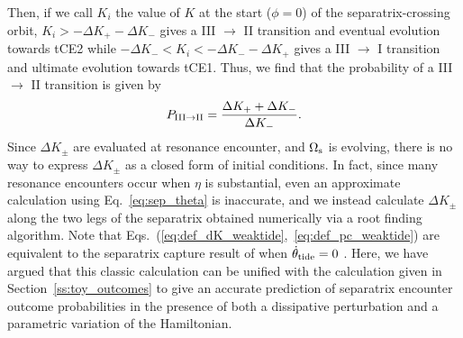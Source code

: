 \documentclass[
        fleqn,
        usenatbib,
    ]{mnras}
\begin{document}
Then, if we call $K_i$ the value of $K$ at the start ($\phi = 0$) of the
separatrix-crossing orbit, $K_i > -\Delta K_+ - \Delta K_-$ gives a III
$\to$ II transition and eventual evolution towards tCE2 while $-\Delta K_- < K_i
< -\Delta K_- - \Delta K_+$ gives a III $\to$ I transition and ultimate
evolution towards tCE1. Thus, we find that the probability of a III $\to$ II
transition is given by
\begin{equation}
    P_{\rm III \to II} = \frac{\Delta K_+ + \Delta K_-}{\Delta
        K_-}.\label{eq:def_pc_weaktide}
\end{equation}
Since $\Delta K_{\pm}$ are evaluated at resonance encounter, and
$\Omega_{\rm s}$ is evolving, there is no way to express $\Delta K_{\pm}$ as a
closed form of initial conditions. In fact, since many resonance encounters
occur when $\eta$ is substantial, even an approximate calculation using
Eq.~\eqref{eq:sep_theta} is inaccurate, and we instead calculate $\Delta
K_{\pm}$ along the two legs of the separatrix obtained numerically via a root
finding algorithm. Note that
Eqs.~(\ref{eq:def_dK_weaktide},~\ref{eq:def_pc_weaktide}) are equivalent to the
separatrix capture result of \citet{henrard1982} when $\dot{\theta}_{\rm tide} =
0$ \citep{henrard1987}. Here, we have argued that this classic calculation can
be unified with the calculation given in Section~\ref{ss:toy_outcomes} to give
an accurate prediction of separatrix encounter outcome probabilities in the
presence of both a dissipative perturbation and a parametric variation of the
Hamiltonian.
\end{document}
